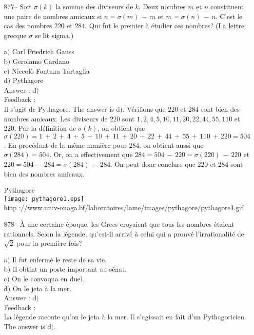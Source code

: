 \documentclass[letterpaper, 12pt]{article}
\begin{document}
877-- Soit $\sigma(k)$ la somme des diviseurs de $k$. Deux nombres
$m$ et $n$ constituent une paire de nombres amicaux si
$n=\sigma(m)\,-\,m$ et $m=\sigma(n)\,-\,n$. C'est le cas des nombres
$220$ et $284$. Qui fut le premier \`a \'etudier ces nombres? (La
lettre grecque $\sigma$ se lit sigma.)

a$)$ Carl Friedrich Gauss \\
b$)$ Gerolamo Cardano \\
c$)$ Niccol\`o Fontana Tartaglia\\
d$)$ Pythagore \\

Answer : d$)$\\

Feedback :\\
Il s'agit de Pythagore. The answer is d$)$. V\'erifions que $220$
et $284$ sont bien des nombres amicaux. Les diviseurs de $220$ sont
$1,2,4,5,10,11,20,22,44,55,110$ et $220$. Par la d\'efinition de
$\sigma(k)$, on obtient que
$\sigma(220)=1\,+\,2\,+\,4\,+\,5\,+\,10\,+\,11\,+\,20\,+\,22\,+\,44\,+\,55\,+\,110\,+\,220=504$.
En proc\'edant de la m\^eme mani\`ere pour $284$, on obtient aussi
que $\sigma(284)=504$. Or, on a effectivement que
$284=504\,-\,220=\sigma(220)\,-\,220$ et
$220=504\,-\,284=\sigma(284)\,-\,284$. On peut donc conclure
que $220$ et $284$ sont bien des nombres amicaux. \\

        \begin{center}
        Pythagore\\
    \texttt{[image: pythagore1.eps]}\\
        {\footnotesize http
://www.univ-ouaga.bf/laboratoires/lame/images/pythagore/pythagore1.gif}
    \end{center}

878-- \`A une certaine \'epoque, les Grecs croyaient que tous les
nombres \'etaient rationnels. Selon la l\'egende, qu'est-il arriv\'e
\`a celui qui a prouv\'e l'irrationalit\'e de $\sqrt2$ pour la
premi\`ere fois?

a$)$ Il fut enferm\'e le reste de sa vie. \\
b$)$ Il obtint un poste important au s\'enat. \\
c$)$ On le convoqua en duel. \\
d$)$ On le jeta \`a la mer.\\

Answer : d$)$\\

Feedback : \\
La l\'egende raconte qu'on le jeta \`a la mer. Il s'agissait en fait d'un
Pythagoricien. The answer is d$)$.\\
\end{document}
